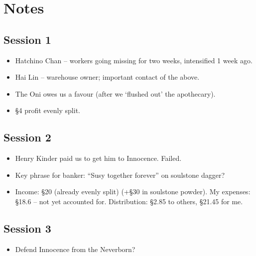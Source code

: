\documentclass[10pt,a4paper]{article}
\begin{document}
\begin{minipage}[t]{\textwidth}

\section*{Notes}

\subsection*{Session 1}

	\begin{itemize}
	  \item Hatchino Chan -- workers going missing for two weeks, intensified 1 week ago.
	  \item Hai Lin -- warehouse owner; important contact of the above.
	  \item The Oni owes us a favour (after we `flushed out' the apothecary).
	  \item §4 profit evenly split.
	\end{itemize}

\subsection*{Session 2} 

  \begin{itemize}
    \item Henry Kinder paid us to get him to Innocence. Failed.
    \item Key phrase for banker: ``Susy together forever'' on soulstone dagger?
    \item Income: §20 (already evenly split) (+§30 in soulstone powder). My expenses: §18.6 -- not yet accounted for. Distribution: §2.85 to others, §21.45 for me.
  \end{itemize}
  
\subsection*{Session 3}

  \begin{itemize}
    \item Defend Innocence from the Neverborn?
  \end{itemize}


\end{minipage}

\newpage
\end{document}
